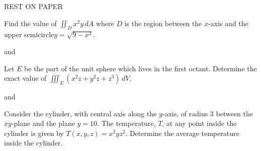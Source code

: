 \documentclass[11pt]{article}
\begin{document}
\vspace{2cm}
\begin{center}
\textsc{REST ON PAPER}
\end{center}

Find the value of \(\iint_{D}x^{2}y \, dA\) where \(D\) is the region between the \(x\)-axis and the upper semicircle\(y = \sqrt{9 - x^{2}}\).

and 

Let \(E\) be the part of the unit sphere which lives in the first octant. Determine the exact value of \(\iiint_{E}(x^{2}z + y^{2}z + z^{3})\, dV\).

and

Consider the cylinder, with central axis along the \(y\)-axis, of radius 3 between the \(xy\)-plane and the plane \(y = 10\). The temperature, \(T\), at any point inside the cylinder is given by \(T(x,y,z) = x^{2}yz^{2}\). Determine the average temperature inside the cylinder. 
\end{document}
